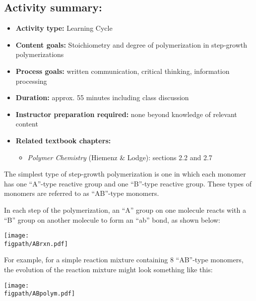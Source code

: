 \begin{activity}
\begin{instructornotes}
	\subsection*{Activity summary:}
	\begin{itemize}
		\item \textbf{Activity type:} Learning Cycle
		\item \textbf{Content goals:} Stoichiometry and degree of polymerization in step-growth polymerizations
		\item \textbf{Process goals:} %
			written communication, critical thinking, information processing
		\item \textbf{Duration:} approx. 55 minutes including class discussion
		\item \textbf{Instructor preparation required:} none beyond knowledge of relevant content
		\item \textbf{Related textbook chapters:}
			\begin{itemize}
				\item \emph{Polymer Chemistry} (Hiemenz \& Lodge): sections 2.2 and 2.7
			\end{itemize}
	\end{itemize}

\end{instructornotes}


\begin{model}

The simplest type of step-growth polymerization is one in which each monomer has one ``A''-type reactive group and one ``B''-type reactive group.
These types of monomers are referred to as ``AB''-type monomers.

In each step of the polymerization, an ``A'' group on one molecule reacts with a ``B'' group on another molecule to form an ``ab'' bond, as shown below:

\vspace{0.1in}
\centerline{\texttt{[image: \\figpath/ABrxn.pdf]}}

For example, for a simple reaction mixture containing 8 ``AB''-type monomers, the evolution of the reaction mixture might look something like this:

\vspace{0.1in}
\centerline{\texttt{[image: \\figpath/ABpolym.pdf]}}


\end{model}
\end{activity}
